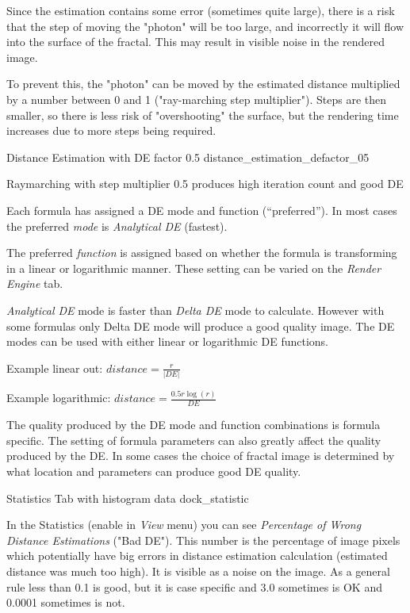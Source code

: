 Since the estimation contains some error (sometimes quite large), there is a
risk that the step of moving the "photon" will be too large, and incorrectly it
will flow into the surface of the fractal. This may result in visible noise in
the rendered image.

To prevent this, the "photon" can be moved by the estimated distance multiplied
by a number between 0 and 1 ("ray-marching step multiplier"). Steps are then
smaller, so there is less risk of "overshooting" the surface, but the rendering
time increases due to more steps being required.

\nopagebreak

{Distance Estimation with DE factor 0.5}
{distance_estimation_defactor_05}

Raymarching with step multiplier 0.5 produces high iteration count and good DE

Each formula has assigned a DE mode and function (``preferred''). In most cases
the preferred \emph{mode} is \emph{Analytical DE} (fastest).

The preferred \emph{function} is assigned based on whether the formula is
transforming in a linear or logarithmic manner. These setting can be varied on
the \emph{Render Engine} tab.

\emph{Analytical DE} mode is faster than \emph{Delta DE} mode to calculate.
However with some formulas only Delta DE mode will produce a good quality image.
The DE modes can be used with either linear or logarithmic DE functions.

Example linear out: $ distance = \frac{r}{\lvert DE \rvert} $

Example logarithmic: $ distance = \frac{0.5 r  \log(r)}{DE} $

The quality produced by the DE mode and function combinations is formula
specific. The setting of formula parameters can also greatly affect the quality
produced by the DE. In some cases the choice of fractal image is determined by
what location and parameters can produce good DE quality.

\nopagebreak

{Statistics Tab with histogram data}
{dock_statistic}

In the Statistics (enable in \emph{View} menu) you can see \emph{Percentage of
	Wrong Distance Estimations} ("Bad DE"). This number is the percentage of image
pixels which potentially have big errors in distance estimation calculation
(estimated distance was much too high). It is visible as a noise on the image.
As a general rule less than 0.1 is good, but it is case specific and 3.0
sometimes is OK and 0.0001 sometimes is not.
